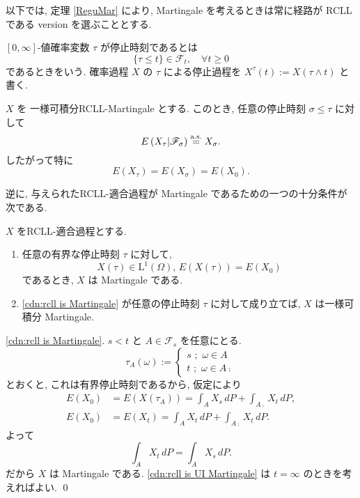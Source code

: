 \documentclass{ltjsarticle}
\begin{document}
以下では, 定理 \ref{ReguMar} により, Martingale を考えるときは常に経路が RCLL である version を選ぶこととする.

\begin{dfn}[停止時刻]
	\( [0,\infty] \)-値確率変数 \( \tau \) が停止時刻であるとは
	\[
		\{ \tau \le t \} \in \mathscr{F}_t,	\quad	\forall t \ge 0
	\]
	であるときをいう. 確率過程 \( X \) の \( \tau \) による停止過程を
	\( X^{\tau}(t) := X( \tau \wedge t) \) と書く.
\end{dfn}


\begin{thm}
	\( X \) を 一様可積分RCLL-Martingale とする.
	このとき, 任意の停止時刻 \( \sigma \le \tau \) に対して
	\[
		E \left( X_{\tau} | \mathscr{F}_{\sigma} \right) \stackrel{ \text{a.s.} }{ = } X_{\sigma}.
	\]
	したがって特に
	\[
		E( X_{\tau} ) = E( X_{\sigma} ) = E ( X_0 ).
	\]
\end{thm}

逆に, 与えられたRCLL-適合過程が Martingale であるための一つの十分条件が次である.
\begin{prp}	\label{CharaMar}
	\( X \) をRCLL-適合過程とする.
	\begin{enumerate}
		\item	\label{cdn:rcll is Martingale} 任意の有界な停止時刻 \( \tau \) に対して,
		      \[
			      X ( \tau ) \in \mathrm{L}^1(\Omega),\,
			      E( X ( \tau ) ) = E(X_0)
		      \]
		      であるとき, \( X \) は Martingale である.
		\item \label{cdn:rcll is UI Martingale} \ref{cdn:rcll is Martingale} が任意の停止時刻 \( \tau \) に対して成り立てば,
		      \( X \) は一様可積分 Martingale.
	\end{enumerate}
\end{prp}

\begin{prf}
	\ref{cdn:rcll is Martingale}.
	\( s < t \) と \( A \in \mathscr{F}_s \) を任意にとる.
	\[
		\tau_A ( \omega )	:=	\begin{cases}
			s \,\, ; \,\, \omega \in A \\
			t \,\, ; \,\, \omega \in A\comp
		\end{cases}
	\]
	とおくと, これは有界停止時刻であるから, 仮定により
	\begin{align*}
		E( X_0 ) & =	E( X( \tau_A ) )	= \int_A X_s\, dP + \int_{A \comp} X_t\, dP,
		\\
		E( X_0 ) & =	E( X_t )	= \int_A X_t\, dP + \int_{A \comp} X_t\, dP.
	\end{align*}
	よって
	\[
		\int_A X_t\, dP	=	\int_A X_s\, dP.
	\]
	だから \( X \) は Martingale である. \ref{cdn:rcll is UI Martingale} は \( t = \infty \) のときを考えればよい.
	\qed\end{prf}
\end{document}
